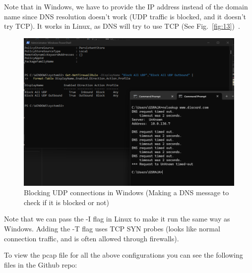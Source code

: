 \documentclass{article}
\begin{document}
Note that in Windows, we have to provide the IP address instead of the domain name since DNS resolution doesn't work (UDP traffic is blocked, and it doesn't try TCP).
It works in Linux, as DNS will try to use TCP (See Fig.~\ref{fig:13})~\cite{systemd_issue19554_comment1409535760}.

\begin{figure}[H]
    \centering
    \includegraphics[width=1\linewidth]{block udp connections windows.png}
    \caption{Blocking UDP connections in Windows (Making a DNS message to check if it is blocked or not)}
    \label{fig:placeholder}
\end{figure}

Note that we can pass the -I flag in Linux to make it run the same way as Windows. Adding the -T flag uses TCP SYN probes (looks like normal connection traffic, and is often allowed through firewalls). 

To view the pcap file for all the above configurations you can see the following files in the Github repo:
\end{document}
